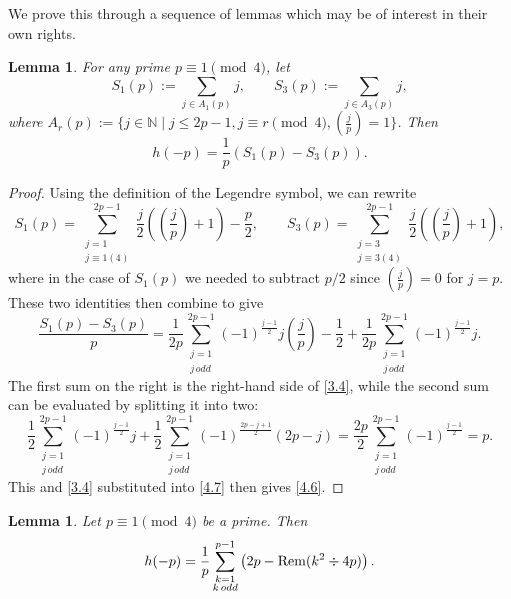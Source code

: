\documentclass{amsart}
\theoremstyle{plain}
\newtheorem{lemma}[theorem]{Lemma}
\numberwithin{equation}{section}
\begin{document}
We prove this through a sequence of lemmas which may be of interest in their
own rights.

\begin{lemma}\label{lem:4.4}
For any prime $p\equiv 1\pmod{4}$, let
\begin{equation}\label{4.5}
S_1(p):=\sum_{j\in A_1(p)}j,\qquad S_3(p):=\sum_{j\in A_3(p)}j,
\end{equation}
where $A_r(p):=\{j\in{\mathbb N}\mid j\leq 2p-1, j\equiv r\pmod{4},
(\frac{j}{p})=1\}$. Then
\begin{equation}\label{4.6}
h(-p)=\frac{1}{p}\left(S_1(p)-S_3(p)\right).
\end{equation}
\end{lemma}

\begin{proof}
Using the definition of the Legendre symbol, we can rewrite
\[
S_1(p)=\sum_{\substack{j=1\\j\equiv 1 (4)}}^{2p-1}
\frac{j}{2}\left(\left(\frac{j}{p}\right)+1\right)-\frac{p}{2},\qquad
S_3(p)=\sum_{\substack{j=3\\j\equiv 3 (4)}}^{2p-1}
\frac{j}{2}\left(\left(\frac{j}{p}\right)+1\right),
\]
where in the case of $S_1(p)$ we needed to subtract $p/2$ since 
$(\frac{j}{p})=0$ for $j=p$. These two identities then combine to give
\begin{equation}\label{4.7}
\frac{S_1(p)-S_3(p)}{p}=\frac{1}{2p}\sum_{\substack{j=1\\j\,odd}}^{2p-1}
(-1)^{\frac{j-1}{2}}j\left(\frac{j}{p}\right)-\frac{1}{2}
+\frac{1}{2p}\sum_{\substack{j=1\\j\,odd}}^{2p-1}(-1)^{\frac{j-1}{2}}j.
\end{equation}
The first sum on the right is the right-hand side of \eqref{3.4}, while the
second sum can be evaluated by splitting it into two:
\[
\frac{1}{2}\sum_{\substack{j=1\\j\,odd}}^{2p-1}(-1)^{\frac{j-1}{2}}j
+\frac{1}{2}\sum_{\substack{j=1\\j\,odd}}^{2p-1}(-1)^{\frac{2p-j+1}{2}}(2p-j)
=\frac{2p}{2}\sum_{\substack{j=1\\j\,odd}}^{2p-1}(-1)^{\frac{j-1}{2}} = p.
\]
This and \eqref{3.4} substituted into \eqref{4.7} then gives \eqref{4.6}.
\end{proof}

\begin{lemma}\label{lem:4.5}
Let $p\equiv 1\pmod{4}$ be a prime. Then
\begin{equation}\label{4.8}
h(-p)=\frac{1}{p}\sum_{\substack{k=1\\k\,odd}}^{p-1}
\left(2p-{\rm Rem}(k^2\div 4p)\right).
\end{equation}
\end{lemma}
\end{document}

